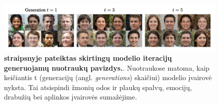 \documentclass{VUMIFInfKursinis}
\begin{document}
\begin{figure}[H]
    \centering
    \includegraphics[scale=0.5]{img/nuotraukuKolapsas.png}
    \caption{\textbf{\cite{ModelsGoMAD} straipsnyje pateiktas skirtingų modelio iteracijų generuojamų nuotraukų pavizdys.}. Nuotraukose matoma, kaip keičiantis t (generacijų (angl. \textsl{generations}) skaičiui) modelio įvairovė nyksta. Tai atsispindi žmonių odos ir plaukų spalvų, emocijų, drabužių bei aplinkos įvairovės sumažėjime.}  
    \label{img:nuotraukuKolapsas}
\end{figure}
\end{document}
